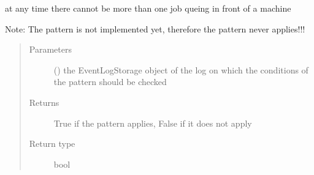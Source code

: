 \documentclass[letterpaper,10pt,english]{sphinxmanual}
\begin{document}
\begin{fulllineitems}
\begin{fulllineitems}
\label{\detokenize{event_log_analyzer:event_log_analyzer.pattern_library.manufacturing_scheduling_patterns.OneBlocking.pattern_applies}}
\sphinxAtStartPar
at any time there cannot be more than one job queing in front of a machine

\sphinxAtStartPar
Note: The pattern is not implemented yet, therefore the pattern never applies!!!
\begin{quote}\begin{description}
\item[{Parameters}] \leavevmode
\sphinxAtStartPar
{} ({\hyperref[\detokenize{event_log_analyzer:event_log_analyzer.event_log.EventLogStorage}]{}}) \textendash{} the EventLogStorage object of the log on which the conditions of the pattern should be checked

\item[{Returns}] \leavevmode
\sphinxAtStartPar
True if the pattern applies, False if it does not apply

\item[{Return type}] \leavevmode
\sphinxAtStartPar
bool

\end{description}\end{quote}

\end{fulllineitems}


\end{fulllineitems}

\end{document}
